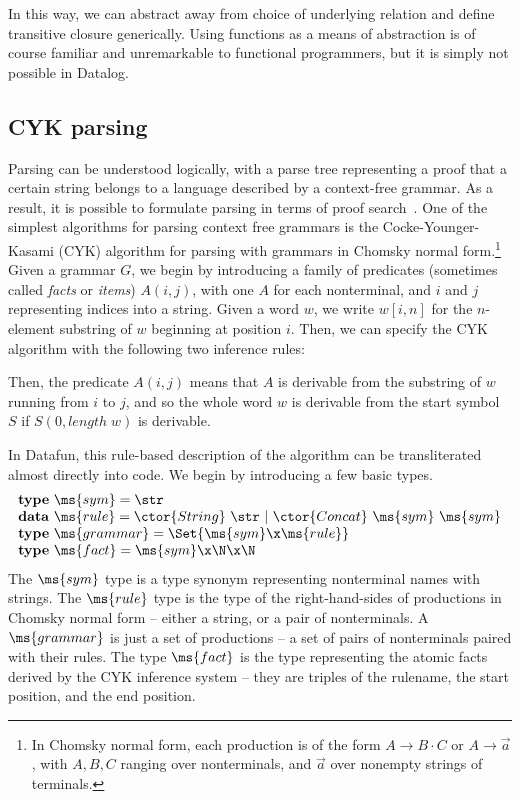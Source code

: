 In this way, we can abstract away from choice of underlying relation and define
transitive closure generically. Using functions as a means of abstraction is of
course familiar and unremarkable to functional programmers, but it is simply not
possible in Datalog.


\subsection{CYK parsing}
Parsing can be understood logically, with a parse tree representing a
proof that a certain string belongs to a language described by a
context-free grammar. As a result, it is possible to formulate parsing
in terms of proof search~\cite{deductive-parsing}. One of the
simplest algorithms for parsing context free grammars is the
Cocke-Younger-Kasami (CYK) algorithm for parsing with grammars in
Chomsky normal form.\footnote{In Chomsky normal form, each production
  is of the form $A \to B \cdot C$ or $A \to \vec{a}$, with $A,B,C$
  ranging over nonterminals, and $\vec{a}$ over nonempty strings of
  terminals.}  Given a grammar $G$, we begin by introducing a family
of predicates (sometimes called \emph{facts} or \emph{items}) $A(i,j)$,
with one $A$ for each nonterminal, and $i$ and $j$ representing
indices into a string. Given a word $w$, we write $w[i,n]$ for the
$n$-element substring of $w$ beginning at position $i$. Then, we can
specify the CYK algorithm with the following two inference rules:

Then, the predicate $A(i,j)$ means that $A$ is derivable from the
substring of $w$ running from $i$ to $j$, and so the whole word $w$ is
derivable from the start symbol $S$ if $S(0, \mathit{length}\;w)$ is
derivable.

In Datafun, this rule-based description of the algorithm can be
transliterated almost directly into code. We begin by introducing a
few basic types.
\[\begin{array}{l}
\mathbf{type}~\ms{sym} = \str\\
\mathbf{data}~\ms{rule} = \ctor{String}~\str ~|~ \ctor{Concat}~\ms{sym}~\ms{sym}\\
\mathbf{type}~\ms{grammar} = \Set{\ms{sym} \x \ms{rule}}\\
\mathbf{type}~\ms{fact} = \ms{sym} \x \N \x \N\\
\end{array}\]
The $\ms{sym}$ type is a type synonym representing nonterminal names
with strings. The $\ms{rule}$ type is the type of the right-hand-sides
of productions in Chomsky normal form -- either a string, or a pair of
nonterminals. A $\ms{grammar}$ is just a set of productions -- a set
of pairs of nonterminals paired with their rules. The type $\ms{fact}$
is the type representing the atomic facts derived by the CYK inference
system -- they are triples of the rulename, the start position, and
the end position.

